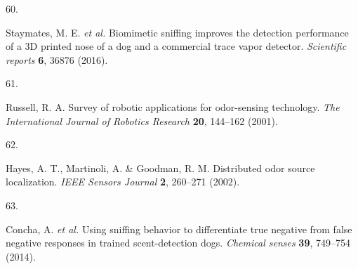 \documentclass[
]{article}
\newlength{\cslhangindent}
\newlength{\csllabelwidth}
\newlength{\cslentryspacingunit} %
\newenvironment{CSLReferences}[2] %
 {%
  \setlength{\parindent}{0pt}
  \ifodd #1
  \let\oldpar\par
  \def\par{\hangindent=\cslhangindent\oldpar}
  \fi
  \setlength{\parskip}{#2\cslentryspacingunit}
 }%
 {}
\newcommand{\CSLLeftMargin}[1]{\parbox[t]{\csllabelwidth}{#1}}
\newcommand{\CSLRightInline}[1]{\parbox[t]{\linewidth - \csllabelwidth}{#1}\break}
\begin{document}
\begin{CSLReferences}{0}{0}
\leavevmode{}%
\CSLLeftMargin{60. }%
\CSLRightInline{Staymates, M. E. \emph{et al.} Biomimetic sniffing improves the detection performance of a 3D printed nose of a dog and a commercial trace vapor detector. \emph{Scientific reports} \textbf{6}, 36876 (2016).}

\leavevmode{}%
\CSLLeftMargin{61. }%
\CSLRightInline{Russell, R. A. Survey of robotic applications for odor-sensing technology. \emph{The International Journal of Robotics Research} \textbf{20}, 144--162 (2001).}

\leavevmode{}%
\CSLLeftMargin{62. }%
\CSLRightInline{Hayes, A. T., Martinoli, A. \& Goodman, R. M. Distributed odor source localization. \emph{IEEE Sensors Journal} \textbf{2}, 260--271 (2002).}

\leavevmode{}%
\CSLLeftMargin{63. }%
\CSLRightInline{Concha, A. \emph{et al.} Using sniffing behavior to differentiate true negative from false negative responses in trained scent-detection dogs. \emph{Chemical senses} \textbf{39}, 749--754 (2014).}

\end{CSLReferences}
\end{document}

